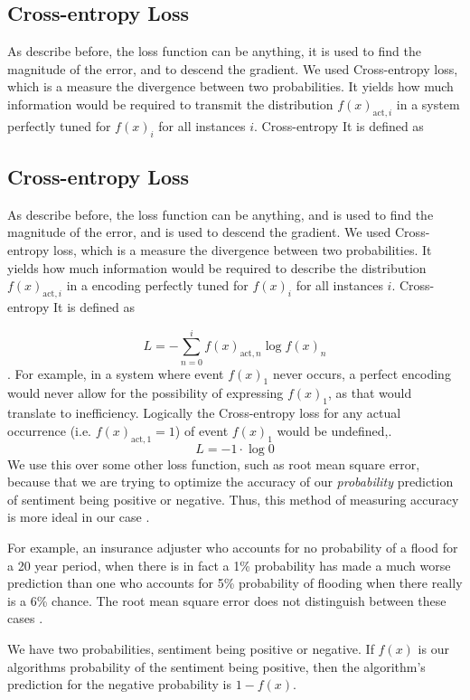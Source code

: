 \documentclass[titlepage,letterpaper]{article}
\begin{document}
\subsection{Cross-entropy Loss}
As describe before, the loss function can be anything, it is used to find the magnitude of the error, and to descend the gradient. We used Cross-entropy loss, which is a measure the divergence between two probabilities. It yields how much information would be required to transmit the distribution \(f(x)_{\text{act},i} \) in a system perfectly tuned for \(f(x)_i \) for all instances \(i\). Cross-entropy It is defined as \cite{NeuralNet}


\subsection{Cross-entropy Loss} \label{loss-section}
As describe before, the loss function can be anything, and is used to find the magnitude of the error, and is used to descend the gradient. We used Cross-entropy loss, which is a measure the divergence between two probabilities. It yields how much information would be required to describe the distribution \(f(x)_{\text{act},i} \) in a encoding perfectly tuned for \(f(x)_i \) for all instances \(i\). Cross-entropy It is defined as \cite{NeuralNet}

\[L = -\sum_{n=0}^i f(x)_{\text{act},n} \log f(x)_n\]. 
For example, in a system where event \(f(x)_1\) never occurs, a perfect encoding would never allow for the possibility of expressing \(f(x)_1\), as that would translate to inefficiency. Logically the Cross-entropy loss for any actual occurrence (i.e. \(f(x)_{\text{act},1}= 1\)) of  event \(f(x)_1\) would be undefined,.
\[L = -1\cdot\log 0 \]
We use this over some other loss function, such as root mean square error, because that we are trying to optimize the accuracy of our \textit{probability} prediction of sentiment being positive or negative. Thus, this method of measuring accuracy is more ideal in our case . 


For example, an insurance adjuster who accounts for no probability of a flood for a 20 year period, when there is in fact a 1\% probability has made a much worse prediction than one who accounts for 5\% probability of flooding when there really is a 6\% chance. The root mean square error does not distinguish between these cases \cite{NeuralNet}.

We have two probabilities, sentiment being positive or negative. If \(f(x)\) is our algorithms probability of the sentiment being positive, then the algorithm's prediction for the negative probability is \(1-f(x)\).
\end{document}
